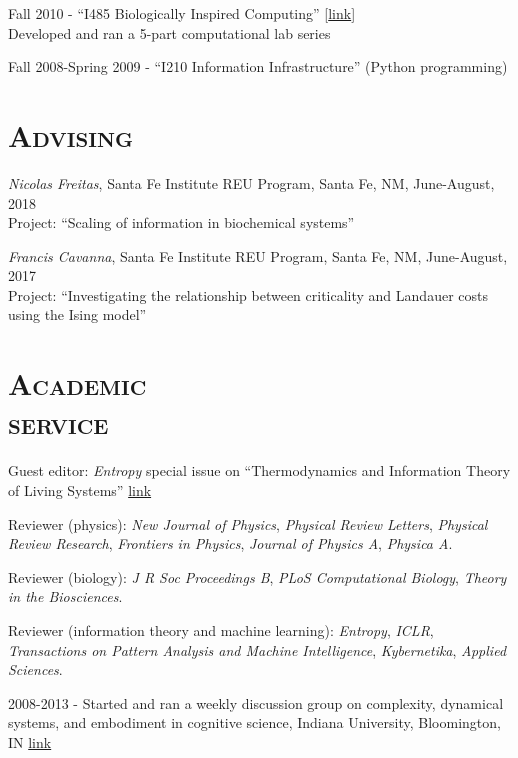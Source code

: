 \documentclass[margin,line,centered]{res}
\begin{document}
\begin{resume}
Fall 2010 - ``I485 Biologically Inspired Computing'' {[}\href{https://web.archive.org/web/20110310071102/http://www.informatics.indiana.edu/rocha/i-bic/index.html}{link}{]}\\
Developed and ran a 5-part computational lab series

Fall 2008-Spring 2009 - ``I210 Information Infrastructure'' (Python programming)



\section{\textsc{Advising}}
\emph{Nicolas Freitas}, Santa Fe Institute REU Program, Santa Fe, NM, June-August, 2018 \\
Project: ``Scaling of information in biochemical systems''

\emph{Francis Cavanna}, Santa Fe Institute REU Program, Santa Fe, NM, June-August, 2017 \\
Project: ``Investigating the relationship between criticality and Landauer costs using the Ising model''

\section{\textsc{Academic\\service}}

{Guest editor}: \emph{Entropy} special issue on ``Thermodynamics and Information Theory of Living Systems'' \href{https://www.mdpi.com/journal/entropy/special_issues/thermodynamics_living_systems}{link}

{Reviewer} (physics): \emph{New Journal of Physics}, \emph{Physical Review Letters}, \emph{Physical Review Research}, \emph{Frontiers in Physics}, \emph{Journal of Physics A}, \emph{Physica A}.

Reviewer (biology): \emph{J R Soc Proceedings B}, \emph{PLoS Computational Biology}, \emph{Theory in the Biosciences}.

Reviewer (information theory and machine learning): \emph{Entropy}, \emph{ICLR}, \emph{Transactions on Pattern Analysis and Machine Intelligence}, \emph{Kybernetika}, \emph{Applied Sciences}.

2008-2013 - Started and ran a weekly discussion group on complexity, dynamical systems, and embodiment in cognitive science, Indiana University, Bloomington, IN \href{http://apophenia.wikidot.com/}{link}


\end{resume}
\end{document}

